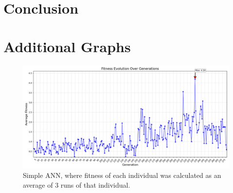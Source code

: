 \documentclass[final,5p,times,twocolumn,authoryear]{elsarticle}
\begin{document}




\section{Conclusion}




\appendix
\section{Additional Graphs}
\label{sec:appendix}

\begin{figure}[H]
    \centering
    \includegraphics[width=1\linewidth]{figures/ann_simples_3runs_params2.png}
    \caption{Simple ANN, where fitness of each individual was calculated as an average of 3 runs of that individual.}
    \label{fig:ann_simples_3runs_params2}
\end{figure}
\end{document}
